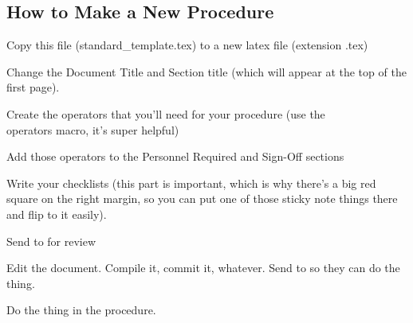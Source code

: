 \subsection{How to Make a New Procedure}
\begin{checklist}
    \item \auth{} Copy this file (standard\_template.tex) to a new latex file (extension .tex)
    \item \auth{} Change the Document Title and Section title (which will appear at the top of the first page).
    \item \auth{} Create the operators that you'll need for your procedure (use the \\operators macro, it's super helpful)
    \item \auth{} Add those operators to the Personnel Required and Sign-Off sections
    \item \auth{} Write your checklists (this part is important, which is why there's a big red square on the right margin, so you can put one of those sticky note things there and flip to it easily). 
    \item \auth{} Send to \edi{} for review
    \item \edi{} Edit the document. Compile it, commit it, whatever. Send to \perf{} so they can do the thing.
    \item \perf{} Do the thing in the procedure.
\end{checklist}
\setcounter{checklistnum}{0}


